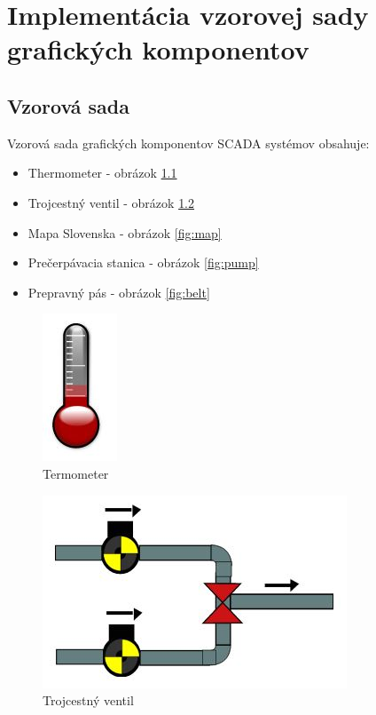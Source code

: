 \chapter{Implementácia vzorovej sady grafických komponentov}

\section{Vzorová sada}
Vzorová sada grafických komponentov SCADA systémov obsahuje:
\begin{itemize}
	\item Thermometer - obrázok \ref{fig:thermometer}
	\item Trojcestný ventil - obrázok \ref{fig:trippleValve}
	\item Mapa Slovenska - obrázok \ref{fig:map}
	\item Prečerpávacia stanica - obrázok \ref{fig:pump}
	\item Prepravný pás - obrázok \ref{fig:belt}
	
\end{itemize}
\begin{figure}[H]
	\centering
	\includegraphics{obrazky/thermometer}
	\caption{Termometer}
	\label{fig:thermometer}
\end{figure}
\begin{figure}[H]
	\centering
	\includegraphics[width=0.7\linewidth]{obrazky/trippleValve}
	\caption{Trojcestný ventil}
	\label{fig:trippleValve}
\end{figure}

